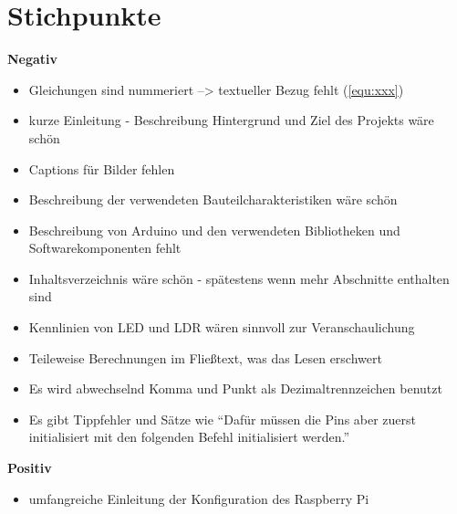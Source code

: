\documentclass[
  a4paper,               %
  twoside,               %
  DIV=12,                %
  BCOR=8mm,              %
  headinclude=true,      %
  footinclude=false,     %
  numbers=noenddot,      %
  headheight=40pt,       %
  9pt]{scrartcl}        %
\begin{document}
\section{Stichpunkte}

\textbf{Negativ}
\begin{itemize}




\item Gleichungen sind nummeriert --> textueller Bezug fehlt (\ref{equ:xxx})
\item kurze Einleitung - Beschreibung Hintergrund und Ziel des Projekts wäre schön
\item Captions für Bilder fehlen
\item Beschreibung der verwendeten Bauteilcharakteristiken wäre schön
\item Beschreibung von Arduino und den verwendeten Bibliotheken und Softwarekomponenten fehlt
\item Inhaltsverzeichnis wäre schön - spätestens wenn mehr Abschnitte enthalten sind
\item Kennlinien von LED und LDR wären sinnvoll zur Veranschaulichung
\item Teileweise Berechnungen im Fließtext, was das Lesen erschwert
\item Es wird abwechselnd Komma und Punkt als Dezimaltrennzeichen benutzt
\item Es gibt Tippfehler und Sätze wie "`Dafür
müssen die Pins aber zuerst initialisiert mit den folgenden Befehl initialisiert werden."'

\end{itemize}


\textbf{Positiv}
\begin{itemize}
\item umfangreiche Einleitung der Konfiguration des Raspberry Pi
\end{itemize}
\end{document}
